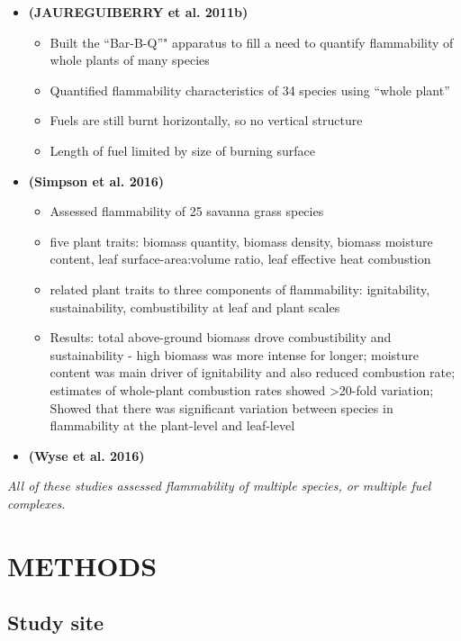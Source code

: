 \documentclass[11pt,a4paper]{article}
\begin{document}
\begin{itemize}
\item
  \textbf{(JAUREGUIBERRY et al. 2011b)}

  \begin{itemize}
  \item
    Built the ``Bar-B-Q''" apparatus to fill a need to quantify
    flammability of whole plants of many species
  \item
    Quantified flammability characteristics of 34 species using ``whole
    plant''
  \item
    Fuels are still burnt horizontally, so no vertical structure
  \item
    Length of fuel limited by size of burning surface
  \end{itemize}
\item
  \textbf{(Simpson et al. 2016)}

  \begin{itemize}
  \item
    Assessed flammability of 25 savanna grass species
  \item
    five plant traits: biomass quantity, biomass density, biomass
    moisture content, leaf surface-area:volume ratio, leaf effective
    heat combustion
  \item
    related plant traits to three components of flammability:
    ignitability, sustainability, combustibility at leaf and plant
    scales
  \item
    Results: total above-ground biomass drove combustibility and
    sustainability - high biomass was more intense for longer; moisture
    content was main driver of ignitability and also reduced combustion
    rate; estimates of whole-plant combustion rates showed
    \textgreater{}20-fold variation; Showed that there was significant
    variation between species in flammability at the plant-level and
    leaf-level
  \end{itemize}
\item
  \textbf{(Wyse et al. 2016)}
\end{itemize}

\emph{All of these studies assessed flammability of multiple species, or
multiple fuel complexes.}

\hypertarget{methods}{%
\section{METHODS}\label{methods}}

\hypertarget{study-site}{%
\subsection{Study site}\label{study-site}}
\end{document}
